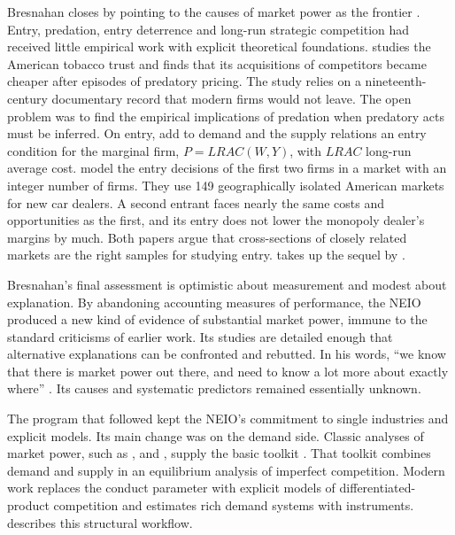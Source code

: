 Bresnahan closes by pointing to the causes of market power as the frontier \citep[Section~6]{Bresnahan1989}. Entry,
predation, entry deterrence and long-run strategic competition had received little empirical work with explicit
theoretical foundations. \citet{Burns1986} studies the American tobacco trust and finds that its acquisitions of
competitors became cheaper after episodes of predatory pricing. The study relies on a nineteenth-century documentary record
that modern firms would not leave. The open problem was to find the empirical implications of predation when predatory acts
must be inferred. On entry, \citet{PanzarRosse1977} add to demand and the supply relations an entry condition for the
marginal firm, $P = \mathit{LRAC}(W, Y)$, with $\mathit{LRAC}$ long-run average cost.
\citet{BresnahanReiss1990} model the entry decisions of the first two firms in a market with an integer number of firms.
They use 149 geographically isolated American markets for new car dealers. A second entrant faces nearly the same costs
and opportunities as the first, and its entry does not lower the monopoly dealer's margins by much. Both papers
argue that cross-sections of closely related markets are the right samples for studying entry. 
takes up the sequel by \citet{BresnahanReiss1991}.

Bresnahan's final assessment is optimistic about measurement and modest about explanation. By abandoning accounting
measures of performance, the NEIO produced a new kind of evidence of substantial market power, immune to the standard
criticisms of earlier work. Its studies are detailed enough that alternative explanations can be confronted and rebutted.
In his words, ``we know that there is market power out there, and need to know a lot more about exactly where''
\citep[p.~1055]{Bresnahan1989}. Its causes and systematic predictors remained essentially unknown.

The program that followed kept the NEIO's commitment to single industries and explicit models. Its main change was on the
demand side. Classic analyses of market power, such as \citet{Porter1983}, \citet{Bresnahan1987} and
\citet{Nevo2001}, supply the basic toolkit \citep[p.~151]{EinavLevin2010}. That toolkit combines demand and supply in
an equilibrium analysis of imperfect competition. Modern work replaces the conduct parameter with explicit models of differentiated-product
competition and estimates rich demand systems with instruments.  describes this structural workflow.

